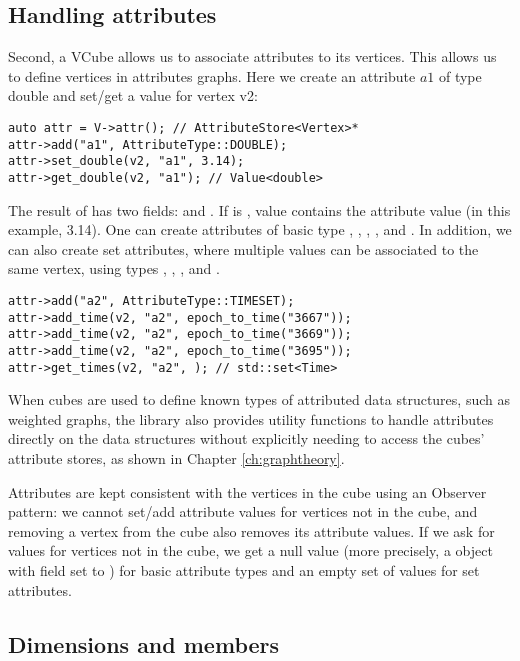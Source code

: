 \subsection{Handling attributes}

Second, a VCube allows us to associate attributes to its vertices. This allows us to define vertices in attributes graphs. Here we create an attribute $a1$ of type double and set/get a value for vertex v2:
\begin{lstlisting}[style=c++]
auto attr = V->attr(); // AttributeStore<Vertex>*
attr->add("a1", AttributeType::DOUBLE); 
attr->set_double(v2, "a1", 3.14);
attr->get_double(v2, "a1"); // Value<double>
\end{lstlisting}
The result of  has two fields:  and . If  is , value contains the attribute value (in this example, 3.14). One can create attributes of basic type , , , , and . In addition, we can also create set attributes, where multiple values can be associated to the same vertex, using types , , , and .
\begin{lstlisting}[style=c++]
attr->add("a2", AttributeType::TIMESET); 
attr->add_time(v2, "a2", epoch_to_time("3667"));
attr->add_time(v2, "a2", epoch_to_time("3669"));
attr->add_time(v2, "a2", epoch_to_time("3695"));
attr->get_times(v2, "a2", ); // std::set<Time>
\end{lstlisting}
When cubes are used to define known types of attributed data structures, such as weighted graphs, the library also provides utility functions to handle attributes directly on the data structures without explicitly needing to access the cubes' attribute stores, as shown in Chapter \ref{ch:graphtheory}.

Attributes are kept consistent with the vertices in the cube using an Observer pattern: we cannot set/add attribute values for vertices not in the cube, and removing a vertex from the cube also removes its attribute values. If we ask for values for vertices not in the cube, we get a null value (more precisely, a  object with field  set to ) for basic attribute types and an empty set of values for set attributes.

\subsection{Dimensions and members}

